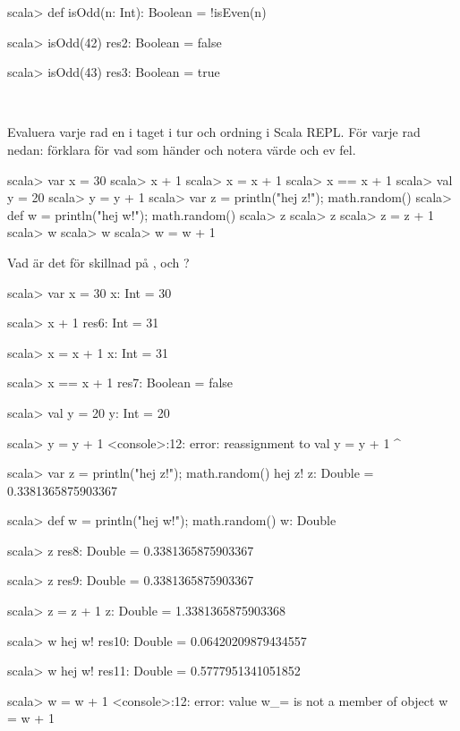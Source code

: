 \SubtaskSolved
\begin{REPL}
scala> def isOdd(n: Int): Boolean = !isEven(n)

scala> isOdd(42)
res2: Boolean = false

scala> isOdd(43)
res3: Boolean = true
\end{REPL}


\QUESTEND






\QUESTBEGIN

\Task \what~

\Subtask
 Evaluera varje rad en i taget i tur och ordning i Scala REPL. För varje rad nedan: förklara för vad som händer och notera värde och ev fel. %
\begin{REPL}
scala> var x = 30
scala> x + 1
scala> x = x + 1
scala> x == x + 1
scala> val y = 20
scala> y = y + 1
scala> var z = { println("hej z!"); math.random() }
scala> def w = { println("hej w!"); math.random() }
scala> z
scala> z
scala> z = z + 1
scala> w
scala> w
scala> w = w + 1
\end{REPL}


\Subtask Vad är det för skillnad på ,  och ?



\SOLUTION

\TaskSolved \what

\SubtaskSolved
\begin{REPL}
  scala> var x = 30
  x: Int = 30

  scala> x + 1
  res6: Int = 31

  scala> x = x + 1
  x: Int = 31

  scala> x == x + 1
  res7: Boolean = false

  scala> val y = 20
  y: Int = 20

  scala> y = y + 1
  <console>:12: error: reassignment to val
         y = y + 1
           ^

  scala> var z = { println("hej z!"); math.random() }
  hej z!
  z: Double = 0.3381365875903367

  scala> def w = { println("hej w!"); math.random() }
  w: Double

  scala> z
  res8: Double = 0.3381365875903367

  scala> z
  res9: Double = 0.3381365875903367

  scala> z = z + 1
  z: Double = 1.3381365875903368

  scala> w
  hej w!
  res10: Double = 0.06420209879434557

  scala> w
  hej w!
  res11: Double = 0.5777951341051852

  scala> w = w + 1
  <console>:12: error: value w_= is not a member of object
         w = w + 1
\end{REPL}


